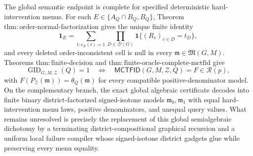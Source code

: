 The global semantic endpoint is complete for specified deterministic hard-intervention menus.  For each \(E\in\{A_Q\cap B_Q,B_Q\}\), Theorem \(\mathrm{thm:order\text{-}normal\text{-}factorization}\) gives the unique finite identity
\[
 \mathbf 1_E
 =\sum_{t:e_E(t)=1}\prod_{D\in\mathcal D(G)}
   \mathbf 1\{(R_v)_{v\in D}=t_D\},
\]
and every deleted order-inconsistent cell is null in every \(\mathfrak m\in\mathfrak M(G,M)\).  Theorems \(\mathrm{thm:finite\text{-}decision}\) and \(\mathrm{thm:finite\text{-}oracle\text{-}complete\text{-}mctfid}\) give
\[
 \operatorname{GID}_{G,M,\mathcal Z}(Q)=1
 \quad\Longleftrightarrow\quad
 \mathsf{MCTFID}(G,M,\mathcal Z,Q)=F\in\mathcal R(p),
\]
with \(F(P_{\mathcal Z}(\mathfrak m))=\theta_Q(\mathfrak m)\) for every compatible positive-denominator model.  On the complementary branch, the exact global algebraic certificate decodes into finite binary district-factorized signed-isotone models \(\mathfrak m_0,\mathfrak m_1\) with equal hard-intervention menu laws, positive denominators, and unequal query values.  What remains unresolved is precisely the replacement of this global semialgebraic dichotomy by a terminating district-compositional graphical recursion and a uniform local failure compiler whose signed-isotone district gadgets glue while preserving every menu equality.